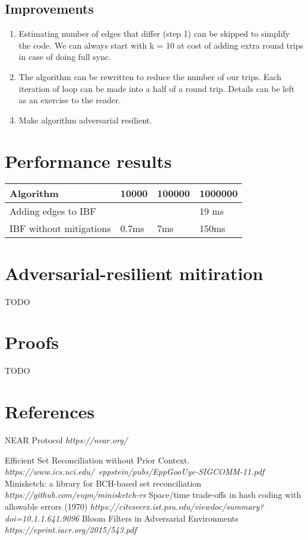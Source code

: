 \documentclass[11pt]{article}
\begin{document}
\subsection{Improvements}
\begin{enumerate}
\item Estimating number of edges that differ (step 1) can be skipped to simplify the code. We can always start with k = 10 at cost of adding extra round trips in case of doing full sync.
\item The algorithm can be rewritten to reduce the number of our trips. Each iteration of loop can be made into a half of a round trip.
Details can be left as an exercise to the reader.
\item Make algorithm adversarial resilient.
\end{enumerate}


\section{Performance results}

\begin{tabular}{ | l | l | l | l |}
    \hline
    Algorithm & 10000 & 100000 & 1000000 \\ \hline
    Adding edges to IBF & & & 19 ms \\
    IBF without mitigations & 0.7ms & 7ms & 150ms  \\   \hline
    \end{tabular}

\section{Adversarial-resilient mitiration}\label{sec:mitigation}
TODO

\section{Proofs}
TODO

\section{References}

\begin{thebibliography}{9}
NEAR Protocol
\textit{https://near.org/}

Efficient Set Reconciliation without Prior Context.
\textit{https://www.ics.uci.edu/~eppstein/pubs/EppGooUye-SIGCOMM-11.pdf}
Minisketch: a library for BCH-based set reconciliation
\textit{https://github.com/eupn/minisketch-rs}
Space/time trade-offs in hash coding with allowable errors (1970)
\textit{https://citeseerx.ist.psu.edu/viewdoc/summary?doi=10.1.1.641.9096}
Bloom Filters in Adversarial Environments
\textit{https://eprint.iacr.org/2015/543.pdf}
\end{thebibliography}
\end{document}
